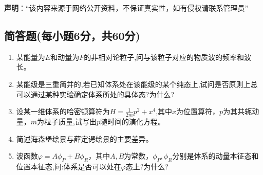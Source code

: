 
\textbf{声明}：“该内容来源于网络公开资料，不保证真实性，如有侵权请联系管理员”

\subsection{简答题(每小题6分，共60分)}
\begin{enumerate}
\item 某能量为$E$和动量为$P$的非相对论粒子,问与该粒子对应的物质波的频率和波长。
\item 某能级是三重简并的,若已知体系处在该能级的某个纯态上,试问是否原则上总可以通过某种实验确定体系所处的具体态?为什么?
\item 设某一维体系的哈密顿算符为$H=\frac{1}{2m}p^2+x^4$,其中$x$为位置算符，$p$为其共轭动量，$m$为粒子质量,试写出$p$随时间的演化方程。
\item 简述海森堡绘景与薛定谔绘景的主要差异。
\item 波函数$\varphi=A\phi_P+B\phi_R$，其中$A,B$为常数，$\phi_P,\phi_R$分别是体系的动量本征态和位置本征态,问:体系是否可以处在$\varphi$态上?为什么?
\end{enumerate}
